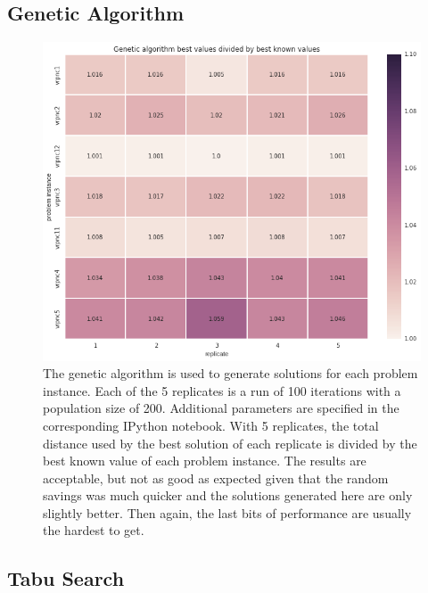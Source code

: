 \documentclass{article} %
\begin{document}
\newpage
\subsection{Genetic Algorithm}


\begin{figure}[!htb]
\begin{center}
 \includegraphics[scale=0.45]{figures/ga_best}
 \caption{\small  The genetic algorithm is used to generate solutions for each problem instance. Each of the 5 replicates is a run of 100 iterations with a population size of 200. Additional parameters are specified in the corresponding IPython notebook. With 5 replicates, the total distance used by the best solution of each replicate is divided by the best known value of each problem instance. The results are acceptable, but not as good as expected given that the random savings was much quicker and the solutions generated here are only slightly better. Then again, the last bits of performance are usually the hardest to get.}
 \label{ga_fig}
 \end{center}
\end{figure}


\newpage
\subsection{Tabu Search}

\end{document}
